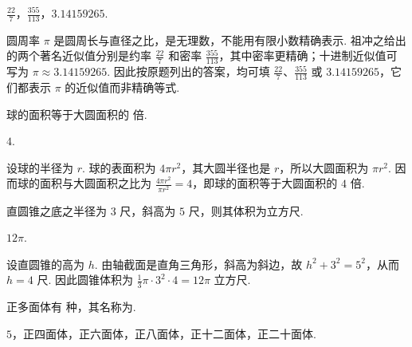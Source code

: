 \documentclass[UTF8,a4paper,oneside,11pt]{ctexbook}
\begin{document}
\begin{answer}
\(\frac{22}{7}\)，\(\frac{355}{113}\)，\(3.14159265\).
\end{answer}

\begin{solution}
圆周率 \(\pi\) 是圆周长与直径之比，是无理数，不能用有限小数精确表示. 祖冲之给出的两个著名近似值分别是约率 \(\frac{22}{7}\) 和密率 \(\frac{355}{113}\)，其中密率更精确；十进制近似值可写为 \(\pi\approx3.14159265\). 因此按原题列出的答案，均可填 \(\frac{22}{7}\)、\(\frac{355}{113}\) 或 \(3.14159265\)，它们都表示 \(\pi\) 的近似值而非精确等式.
\end{solution}

\begin{problem}
球的面积等于大圆面积的\fillinblank{} 倍.
\end{problem}

\begin{answer}
\(4\).
\end{answer}

\begin{solution}
设球的半径为 \(r\). 球的表面积为 \(4\pi r^{2}\)，其大圆半径也是 \(r\)，所以大圆面积为 \(\pi r^{2}\). 因而球的面积与大圆面积之比为 \(\frac{4\pi r^{2}}{\pi r^{2}}=4\)，即球的面积等于大圆面积的 \(4\) 倍.
\end{solution}

\begin{problem}
直圆锥之底之半径为 \(3\text{ 尺}\)，斜高为 \(5\text{ 尺}\)，则其体积为\fillinblank{}\(\text{立方尺}\).
\end{problem}

\begin{answer}
\(12\pi\).
\end{answer}

\begin{solution}
设直圆锥的高为 \(h\). 由轴截面是直角三角形，斜高为斜边，故 \(h^{2}+3^{2}=5^{2}\)，从而 \(h=4\text{ 尺}\). 因此圆锥体积为 \(\frac13\pi\cdot3^{2}\cdot4=12\pi\text{ 立方尺}\).
\end{solution}

\begin{problem}
正多面体有\fillinblank{} 种，其名称为\fillinblank{}.
\end{problem}

\begin{answer}
\(5\)，正四面体，正六面体，正八面体，正十二面体，正二十面体.
\end{answer}
\end{document}
